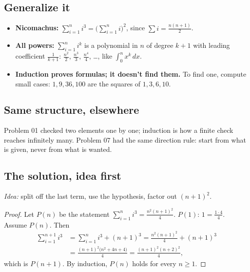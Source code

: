 \documentclass{kaelearn}
\begin{document}
\subsection{Generalize it}
\begin{itemize}
  \item \textbf{Nicomachus:} $\sum_{i=1}^n i^3=\bigl(\sum_{i=1}^n i\bigr)^2$, since $\sum i=\frac{n(n+1)}{2}$.
  \item \textbf{All powers:} $\sum_{i=1}^n i^k$ is a polynomial in $n$ of degree $k+1$ with leading coefficient
        $\frac{1}{k+1}$: $\frac{n^2}{2}$, $\frac{n^3}{3}$, $\frac{n^4}{4}$, \dots, like $\int_0^n x^k\,dx$.
  \item \textbf{Induction proves formulas; it doesn't find them.} To find one, compute small cases:
        $1, 9, 36, 100$ are the squares of $1, 3, 6, 10$.
\end{itemize}

\subsection{Same structure, elsewhere}
Problem 01 checked two elements one by one; induction is how a finite check reaches infinitely many. Problem 07 had the
same direction rule: start from what is given, never from what is wanted.



\subsection{The solution, idea first}
\emph{Idea:} split off the last term, use the hypothesis, factor out $(n+1)^2$.
\begin{proof}
Let $P(n)$ be the statement $\sum_{i=1}^n i^3=\frac{n^2(n+1)^2}{4}$. $P(1)$: $1=\frac{1\cdot4}{4}$. Assume $P(n)$.
Then
\begin{align*}
\sum_{i=1}^{n+1}i^3&=\sum_{i=1}^{n}i^3+(n+1)^3=\frac{n^2(n+1)^2}{4}+(n+1)^3\\
&=\frac{(n+1)^2\bigl(n^2+4n+4\bigr)}{4}=\frac{(n+1)^2(n+2)^2}{4},
\end{align*}
which is $P(n+1)$. By induction, $P(n)$ holds for every $n\ge1$.
\end{proof}
\end{document}
